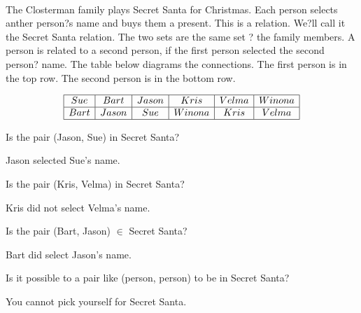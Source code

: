 \documentclass{ximera}
\begin{document}
\begin{exercise}
\quad \\
The Closterman family plays Secret Santa for Christmas. Each person selects anther person?s name and buys them a present. This is a relation. We?ll call it the Secret Santa relation. The two sets are the same set ? the family members. A person is related to a second person, if the first person selected the second person? name. The table below diagrams the connections. The first person is in the top row. The second person is in the bottom row.





\begin{center}
\[
\begin{array}{|c|c|c|c|c|c|}
\hline
Sue & Bart & Jason & Kris & Velma & Winona \\\hline
Bart & Jason & Sue & Winona & Kris & Velma  \\\hline
\end{array}
\]
\end{center}


\begin{problem} Is the pair (Jason, Sue) in Secret Santa? 
\begin{feedback}
Jason selected Sue's name.
\end{feedback}
\end{problem}


\begin{problem} Is the pair (Kris, Velma) in Secret Santa? 
\begin{feedback}
Kris did not select Velma's name.
\end{feedback}
\end{problem}


\begin{problem} Is the pair (Bart, Jason) $\in$ Secret Santa? 
\begin{feedback}
Bart did select Jason's name.
\end{feedback}
\end{problem}


\begin{problem} Is it possible to a pair like (person, person) to be in Secret Santa? 
\begin{feedback}
You cannot pick yourself for Secret Santa.
\end{feedback}
\end{problem}




\end{exercise}
\end{document}
